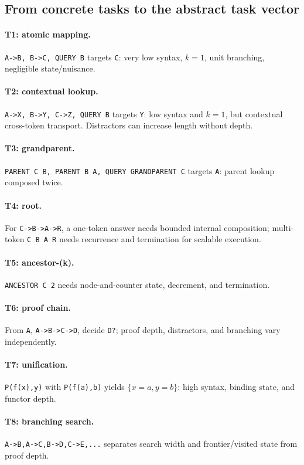 \documentclass[10pt]{article}
\begin{document}
\subsection{From concrete tasks to the abstract task vector}
\paragraph{T1: atomic mapping.} \texttt{A->B, B->C, QUERY B} targets \texttt{C}: very low syntax, $k=1$, unit branching, negligible state/nuisance.
\paragraph{T2: contextual lookup.} \texttt{A->X, B->Y, C->Z, QUERY B} targets \texttt{Y}: low syntax and $k=1$, but contextual cross-token transport. Distractors can increase length without depth.
\paragraph{T3: grandparent.} \texttt{PARENT C B, PARENT B A, QUERY GRANDPARENT C} targets \texttt{A}: parent lookup composed twice.
\paragraph{T4: root.} For \texttt{C->B->A->R}, a one-token answer needs bounded internal composition; multi-token \texttt{C B A R} needs recurrence and termination for scalable execution.
\paragraph{T5: ancestor-(k).} \texttt{ANCESTOR C 2} needs node-and-counter state, decrement, and termination.
\paragraph{T6: proof chain.} From \texttt{A}, \texttt{A->B->C->D}, decide \texttt{D?}; proof depth, distractors, and branching vary independently.
\paragraph{T7: unification.} \texttt{P(f(x),y)} with \texttt{P(f(a),b)} yields $\{x=a,y=b\}$: high syntax, binding state, and functor depth.
\paragraph{T8: branching search.} \texttt{A->B,A->C,B->D,C->E,...} separates search width and frontier/visited state from proof depth.
\end{document}
